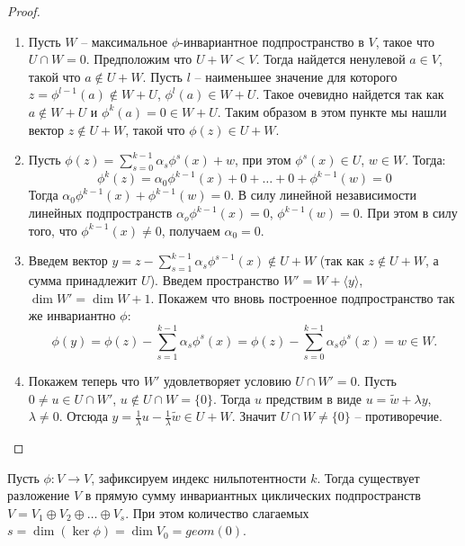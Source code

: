 \begin{proof}~

    \begin{enumerate}
        \item Пусть $W$ -- максимальное $\phi$-инвариантное подпространство в $V$, 
        такое что $U \cap W = {0}$. Предположим что $U + W < V$. 
        Тогда найдется ненулевой $a \in V$, такой что $ a \notin U + W$.  Пусть $l$ -- наименьшее 
        значение для которого $z = \phi^{l-1}(a) \notin W + U$, $\phi^l(a) \in W + U$. 
        Такое очевидно найдется так как $a \notin W + U$ и $\phi^{k}(a) = 0 \in W + U$.
        Таким образом в этом пункте мы нашли вектор $z \notin U+W$, такой что $\phi(z) \in U + W$.

        \item Пусть $\phi(z) = \displaystyle\sum_{s = 0}^{k-1} \alpha_s \phi^s(x) + w$, 
        при этом $\phi^s(x) \in U$, $w \in W$. Тогда:
        $$\phi^{k}(z) = \alpha_0 \phi^{k-1}(x) + 0 + \dots + 0 + \phi^{k-1}(w) = 0$$ 
        Тогда $\alpha_0 \phi^{k-1}(x) + \phi^{k-1}(w) = 0$. 
        В силу линейной независимости линейных подпространств 
        $\alpha_o \phi^{k-1}(x) = 0$, $\phi^{k-1}(w) = 0$. 
        При этом в силу того, что $\phi^{k-1}(x) \neq 0$, получаем $\alpha_0 = 0$.

        \item Введем вектор $y = z - \displaystyle\sum_{s = 1}^{k-1} \alpha_s \phi^{s-1}(x) \notin U + W$ 
        (так как $z \notin U+W$, а сумма принадлежит $U$).
        Введем пространство $W' = W + \langle y \rangle$, $\dim W' = \dim W + 1$. 
        Покажем что вновь построенное подпространство так же инвариантно $\phi$:
        $$\phi(y) = \phi(z) - \displaystyle\sum_{s=1}^{k-1} \alpha_s \phi^s (x) = \phi(z) - 
        \displaystyle\sum_{s=0}^{k-1} \alpha_s \phi^s (x) = w \in W.$$

        \item Покажем теперь что $W'$ удовлетворяет условию $U \cap W' = {0}$. 
        Пусть $0 \neq u \in U \cap W'$, $u \notin U \cap W = \{ 0 \}$. 
        Тогда $u$ предствим в виде $u = \widetilde{w} + \lambda y$, $\lambda \neq 0$. Отсюда 
        $y = \frac{1}{\lambda} u - \frac{1}{\lambda} \widetilde{w} \in U + W$. 
        Значит $U \cap W \neq \{0\}$ -- противоречие.
    \end{enumerate}
\end{proof}

\begin{theorem}
    Пусть $\phi: V \to V$, зафиксируем индекс нильпотентности $k$. Тогда существует разложение $V$ 
    в прямую сумму инвариантных циклических подпространств $V = V_1 \oplus V_2 \oplus \ldots \oplus V_s$. 
    При этом количество слагаемых $s = \dim (\ker \phi) = \dim V_0 = geom(0)$.
\end{theorem}

